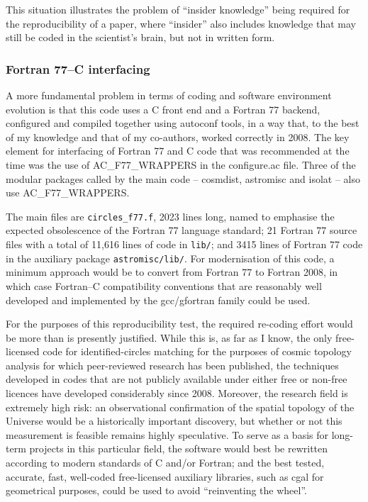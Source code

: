This situation illustrates the problem of ``insider knowledge'' being
required for the reproducibility of a paper, where ``insider'' also
includes knowledge that may still be coded in the scientist's brain,
but not in written form.

\subsubsection{Fortran 77--C interfacing}

A more fundamental problem in terms of coding and software environment
evolution is that this code uses a C front end and a Fortran 77
backend, configured and compiled together using {\sc autoconf} tools,
in a way that, to the best of my knowledge and that of my co-authors,
worked correctly in 2008. The key element for interfacing of Fortran
77 and C code that was recommended at the time was the use of {\sc
AC\_F77\_WRAPPERS} in the {\sc configure.ac}
file\supercite{ACPROGF77}.  Three of the modular packages called by
the main code -- {\sc cosmdist}, {\sc astromisc} and {\sc isolat} --
also use {\sc AC\_F77\_WRAPPERS}.

The main files are {\tt circles\_f77.f}, 2023 lines long, named to
emphasise the expected obsolescence of the Fortran 77 language
standard; 21 Fortran 77 source files with a total of 11,616 lines of
code in {\tt lib/}; and 3415 lines of Fortran 77 code in the auxiliary
package {\tt astromisc/lib/}. For modernisation of this code, a
minimum approach would be to convert from Fortran 77 to Fortran 2008,
in which case Fortran--C compatibility conventions that are reasonably well
developed and implemented by the {\sc gcc/gfortran} family could be used.

For the purposes of this reproducibility test, the required re-coding
effort would be more than is presently justified. While this is, as
far as I know, the only free-licensed code for identified-circles
matching for the purposes of cosmic topology analysis for which
peer-reviewed research has been published, the techniques developed in
codes that are not publicly available under either free or non-free
licences have developed considerably since 2008.  Moreover, the
research field is extremely high risk: an observational confirmation
of the spatial topology of the Universe would be a historically
important discovery, but whether or not this measurement is feasible
remains highly speculative. To serve as a basis for long-term
projects in this particular field, the software would best be
rewritten according to modern standards of C and/or Fortran; and
the best tested, accurate, fast, well-coded free-licensed
auxiliary libraries, such as {\sc cgal} for geometrical purposes,
could be used to avoid ``reinventing the wheel''.

